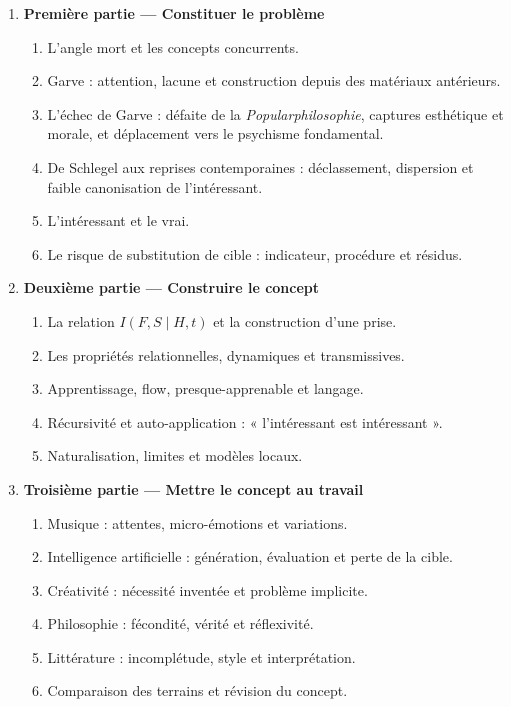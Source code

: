 \documentclass[11pt,a4paper]{article}
\begin{document}
\begin{enumerate}
  \item \textbf{Première partie --- Constituer le problème}
    \begin{enumerate}
      \item L'angle mort et les concepts concurrents.
      \item Garve : attention, lacune et construction depuis des matériaux
            antérieurs.
      \item L'échec de Garve : défaite de la \emph{Popularphilosophie}, captures
            esthétique et morale, et déplacement vers le psychisme fondamental.
      \item De Schlegel aux reprises contemporaines : déclassement, dispersion
            et faible canonisation de l'intéressant.
      \item L'intéressant et le vrai.
      \item Le risque de substitution de cible : indicateur, procédure et résidus.
    \end{enumerate}
  \item \textbf{Deuxième partie --- Construire le concept}
    \begin{enumerate}
      \item La relation \(I(F,S\mid H,t)\) et la construction d'une prise.
      \item Les propriétés relationnelles, dynamiques et transmissives.
      \item Apprentissage, flow, presque-apprenable et langage.
      \item Récursivité et auto-application : « l'intéressant est intéressant ».
      \item Naturalisation, limites et modèles locaux.
    \end{enumerate}
  \item \textbf{Troisième partie --- Mettre le concept au travail}
    \begin{enumerate}
      \item Musique : attentes, micro-émotions et variations.
      \item Intelligence artificielle : génération, évaluation et perte de la
            cible.
      \item Créativité : nécessité inventée et problème implicite.
      \item Philosophie : fécondité, vérité et réflexivité.
      \item Littérature : incomplétude, style et interprétation.
      \item Comparaison des terrains et révision du concept.
    \end{enumerate}
\end{enumerate}
\end{document}
